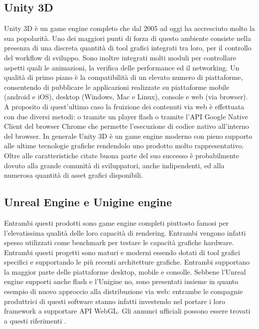 \subsection{Unity 3D}
Unity 3D \`e un game engine completo che dal 2005 ad oggi ha accresciuto molto la sua popolarit\`a. Uno dei maggiori punti di forza di questo ambiente consiste nella presenza di una discreta quantit\`a di tool grafici integrati tra loro, per il controllo del workflow di sviluppo. Sono inoltre integrati molti moduli per controllare aspetti quali le animazioni, la verifica delle performance ed il networking.
Un qualit\`a di primo piano \`e la compatibilit\`a di un elevato numero di piattaforme, consentendo di pubblicare le applicazioni realizzate su piattaforme mobile (android e iOS), desktop (Windows, Mac e Linux), console e web (via browser).
A proposito di quest'ultimo caso la fruizione dei contenuti via web \`e effettuata con due diversi metodi: o tramite un player flash o tramite l'\ac{API} Google Native Client del browser Chrome che permette l'esecuzione di codice nativo all'interno del browser.
In generale Unity 3D \`e un game engine moderno con pieno supporto alle ultime tecnologie grafiche rendendolo uno prodotto molto rappresentativo.
Oltre alle caratteristiche citate buona parte del suo successo \`e probabilmente dovuto alla grande comunit\`a di sviluppatori, anche indipendenti, ed alla numerosa quantit\`a di asset grafici disponibili.


\subsection{Unreal Engine e Unigine engine}
Entrambi questi prodotti sono game engine completi piuttosto famosi per l'elevatissima qualit\`a delle loro capacit\`a di rendering. Entrambi vengono infatti spesso utilizzati come benchmark per testare le capacit\`a grafiche hardware. Entrambi questi progetti sono maturi e moderni essendo dotati di tool grafici specifici e supportando le pi\`u recenti architetture grafiche. Entrambi supportano la maggior parte delle piattaforme desktop, mobile e consolle. Sebbene l'Unreal engine supporti anche flash e l'Unigine no, sono presentati insieme in quanto esempio di nuovo approccio alla distribuzione via web: entrambe le compagnie produttrici di questi software stanno infatti investendo nel portare i loro framework a supportare \ac{API} WebGL. Gli annunci ufficiali possono essere trovati a questi riferimenti \cite{site:mozillaunrealannounce,site:unigineannounce}.

